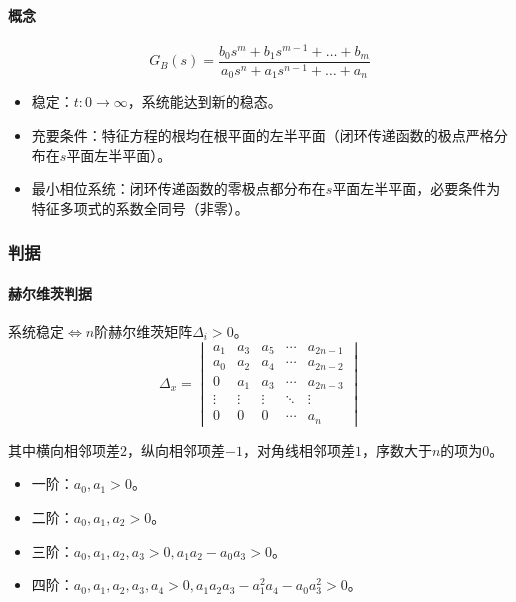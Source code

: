\documentclass[
12pt, %
a4paper, 
oneside, %
headinclude,footinclude, %
]{scrartcl}
\begin{document}
\paragraph{概念}
$$ G_B(s) = \frac{b_0 s^m + b_1 s^{m - 1} + \dots + b_m}{a_0 s^n + a_1 s^{n - 1} + \dots + a_n} $$
\begin{itemize}
\item 稳定：$ t:0 \to \infty $，系统能达到新的稳态。
\item 充要条件：特征方程的根均在根平面的左半平面（闭环传递函数的极点严格分布在$ s $平面左半平面）。
\item 最小相位系统：闭环传递函数的零极点都分布在$ s $平面左半平面，必要条件为特征多项式的系数全同号（非零）。
\end{itemize}
\subsubsection[判据]{判据}
\paragraph{赫尔维茨判据}
系统稳定$ \Leftrightarrow $$ n $阶赫尔维茨矩阵$ \Delta_i > 0 $。
$$ \Delta_x = \begin{vmatrix} a_1 & a_3 & a_5 & \cdots & a_{2n - 1} \\ a_0 & a_2 & a_4 & \cdots & a_{2n - 2} \\ 0   & a_1 & a_3 & \cdots & a_{2n - 3} \\ \vdots & \vdots & \vdots & \ddots & \vdots \\ 0 & 0 & 0 & \cdots & a_n \end{vmatrix} $$

其中横向相邻项差$ 2 $，纵向相邻项差$ -1 $，对角线相邻项差$ 1 $，序数大于$ n $的项为$ 0 $。
\begin{itemize}
\item 一阶：$ a_0, a_1 > 0 $。
\item 二阶：$ a_0, a_1, a_2 > 0 $。
\item 三阶：$ a_0, a_1, a_2, a_3 > 0, a_1 a_2 - a_0 a_3 > 0 $。
\item 四阶：$ a_0, a_1, a_2, a_3, a_4 > 0, a_1 a_2 a_3 - a_1^2 a_4 - a_0 a_3^2  > 0 $。
\end{itemize}
\end{document}
